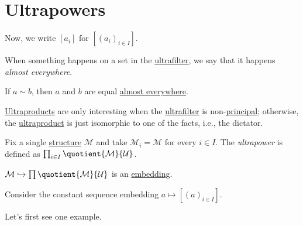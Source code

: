 \section{Ultrapowers}
\begin{notation}
	Now, we write \([a_i]\) for \([(a_i)_{i\in I}]\).
\end{notation}

\begin{notation}\label{not:a.e.}
	When something happens on a set in the \hyperref[def:ultrafilter]{ultrafilter}, we say that it happens \emph{almost everywhere}.
\end{notation}

\begin{eg}
	If \(a \sim b\), then \(a\) and \(b\) are equal \hyperref[not:a.e.]{almost everywhere}.
\end{eg}

\hyperref[def:ultraproduct]{Ultraproducts} are only interesting when the \hyperref[def:ultrafilter]{ultrafilter} is non-\hyperref[eg:principal-filter]{principal}; otherwise, the \hyperref[def:ultraproduct]{ultraproduct} is just isomorphic to one of the facts, i.e., the dictator.

\begin{definition}[Ultrapower]\label{def:ultrapower}
	Fix a single \hyperref[def:structure]{structure} \(\mathcal{M} \) and take \(\mathcal{M} _i = \mathcal{M} \) for every \(i \in I\). The \emph{ultrapower} is defined as \(\prod_{i\in I} \quotient{\mathcal{M} }{\mathcal{U} } \).
\end{definition}

\begin{remark}
	\(\mathcal{M} \hookrightarrow \prod \quotient{\mathcal{M} }{\mathcal{U} } \) is an \hyperref[def:embedding]{embedding}.
\end{remark}
\begin{explanation}
	Consider the constant sequence embedding \(a \mapsto [(a)_{i\in I}]\).
\end{explanation}

Let's first see one example.

